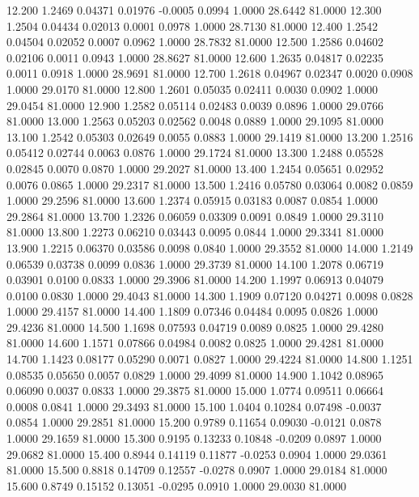   12.200   1.2469   0.04371   0.01976  -0.0005   0.0994   1.0000  28.6442  81.0000
  12.300   1.2504   0.04434   0.02013   0.0001   0.0978   1.0000  28.7130  81.0000
  12.400   1.2542   0.04504   0.02052   0.0007   0.0962   1.0000  28.7832  81.0000
  12.500   1.2586   0.04602   0.02106   0.0011   0.0943   1.0000  28.8627  81.0000
  12.600   1.2635   0.04817   0.02235   0.0011   0.0918   1.0000  28.9691  81.0000
  12.700   1.2618   0.04967   0.02347   0.0020   0.0908   1.0000  29.0170  81.0000
  12.800   1.2601   0.05035   0.02411   0.0030   0.0902   1.0000  29.0454  81.0000
  12.900   1.2582   0.05114   0.02483   0.0039   0.0896   1.0000  29.0766  81.0000
  13.000   1.2563   0.05203   0.02562   0.0048   0.0889   1.0000  29.1095  81.0000
  13.100   1.2542   0.05303   0.02649   0.0055   0.0883   1.0000  29.1419  81.0000
  13.200   1.2516   0.05412   0.02744   0.0063   0.0876   1.0000  29.1724  81.0000
  13.300   1.2488   0.05528   0.02845   0.0070   0.0870   1.0000  29.2027  81.0000
  13.400   1.2454   0.05651   0.02952   0.0076   0.0865   1.0000  29.2317  81.0000
  13.500   1.2416   0.05780   0.03064   0.0082   0.0859   1.0000  29.2596  81.0000
  13.600   1.2374   0.05915   0.03183   0.0087   0.0854   1.0000  29.2864  81.0000
  13.700   1.2326   0.06059   0.03309   0.0091   0.0849   1.0000  29.3110  81.0000
  13.800   1.2273   0.06210   0.03443   0.0095   0.0844   1.0000  29.3341  81.0000
  13.900   1.2215   0.06370   0.03586   0.0098   0.0840   1.0000  29.3552  81.0000
  14.000   1.2149   0.06539   0.03738   0.0099   0.0836   1.0000  29.3739  81.0000
  14.100   1.2078   0.06719   0.03901   0.0100   0.0833   1.0000  29.3906  81.0000
  14.200   1.1997   0.06913   0.04079   0.0100   0.0830   1.0000  29.4043  81.0000
  14.300   1.1909   0.07120   0.04271   0.0098   0.0828   1.0000  29.4157  81.0000
  14.400   1.1809   0.07346   0.04484   0.0095   0.0826   1.0000  29.4236  81.0000
  14.500   1.1698   0.07593   0.04719   0.0089   0.0825   1.0000  29.4280  81.0000
  14.600   1.1571   0.07866   0.04984   0.0082   0.0825   1.0000  29.4281  81.0000
  14.700   1.1423   0.08177   0.05290   0.0071   0.0827   1.0000  29.4224  81.0000
  14.800   1.1251   0.08535   0.05650   0.0057   0.0829   1.0000  29.4099  81.0000
  14.900   1.1042   0.08965   0.06090   0.0037   0.0833   1.0000  29.3875  81.0000
  15.000   1.0774   0.09511   0.06664   0.0008   0.0841   1.0000  29.3493  81.0000
  15.100   1.0404   0.10284   0.07498  -0.0037   0.0854   1.0000  29.2851  81.0000
  15.200   0.9789   0.11654   0.09030  -0.0121   0.0878   1.0000  29.1659  81.0000
  15.300   0.9195   0.13233   0.10848  -0.0209   0.0897   1.0000  29.0682  81.0000
  15.400   0.8944   0.14119   0.11877  -0.0253   0.0904   1.0000  29.0361  81.0000
  15.500   0.8818   0.14709   0.12557  -0.0278   0.0907   1.0000  29.0184  81.0000
  15.600   0.8749   0.15152   0.13051  -0.0295   0.0910   1.0000  29.0030  81.0000
